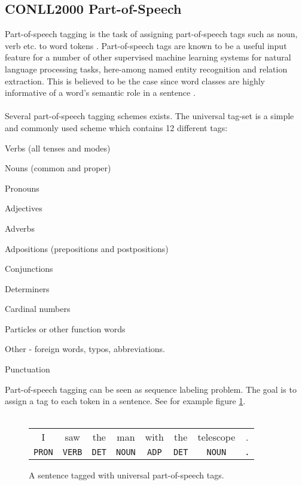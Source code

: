 \subsection{CONLL2000 Part-of-Speech}
Part-of-speech tagging is the task of assigning part-of-speech tags such as noun, verb etc. to word tokens \citep{jurafsky09}. Part-of-speech tags are known to be a useful input feature for a number of other supervised machine learning systems for natural language processing tasks, here-among named entity recognition and relation extraction. This is believed to be the case since word classes are highly informative of a word's semantic role in a sentence \citep{jurafsky09}.
\\\\
Several part-of-speech tagging schemes exists. The universal tag-set is a simple and commonly used scheme which contains 12 different tags:
\begin{description}[labelindent=4em,leftmargin=4em]
	\item [VERB] Verbs (all tenses and modes)
	\item [NOUN] Nouns (common and proper)
	\item [PRON] Pronouns
	\item [ADJ] Adjectives
	\item [ADV] Adverbs
	\item [ADP] Adpositions (prepositions and postpositions)
	\item [CONJ] Conjunctions
	\item [DET] Determiners
	\item [NUM] Cardinal numbers
	\item [PRT] Particles or other function words
	\item [X] Other - foreign words, typos, abbreviations.
	\item [.] Punctuation
\end{description}
\noindent
Part-of-speech tagging can be seen as sequence labeling problem. The goal is to assign a tag to each token in a sentence. See for example figure \ref{pos}.
\\\\
\begin{figure}[h!]
	\begin{center}
		\begin{tabular}{c c c c c c c c}
	I & saw & the & man & with & the & telescope & . \\
	\texttt{PRON} & \texttt{VERB} & \texttt{DET} & \texttt{NOUN} & \texttt{ADP} & \texttt{DET} & \texttt{NOUN} & \texttt{.}
		\end{tabular}
	\end{center}
	\caption{A sentence tagged with universal part-of-speech tags.}
	\label{pos}
\end{figure}
